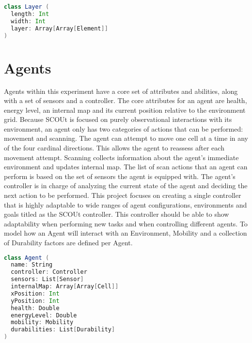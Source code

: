 \begin{lstlisting}[language=Scala]
class Layer (
  length: Int
  width: Int
  layer: Array[Array[Element]]
)
\end{lstlisting}



\section{Agents}
Agents within this experiment have a core set of attributes and abilities, along with a set of sensors and a controller.
The core attributes for an agent are health, energy level, an internal map and its current position relative to the environment grid.
Because SCOUt is focused on purely observational interactions with its environment, an agent only has two categories of actions that can be performed: movement and scanning.
The agent can attempt to move one cell at a time in any of the four cardinal directions.
This allows the agent to reassess after each movement attempt.
Scanning collects information about the agent's immediate environment and updates internal map.
The list of scan actions that an agent can perform is based on the set of sensors the agent is equipped with.
The agent's controller is in charge of analyzing the current state of the agent and deciding the next action to be performed.
This project focuses on creating a single controller that is highly adaptable to wide ranges of agent configurations, environments and goals titled as the SCOUt controller.
This controller should be able to show adaptability when performing new tasks and when controlling different agents.
To model how an Agent will interact with an Environment, Mobility and a collection of Durability factors are defined per Agent.

\begin{lstlisting}[language=Scala]
class Agent (
  name: String
  controller: Controller
  sensors: List[Sensor]
  internalMap: Array[Array[Cell]]
  xPosition: Int
  yPosition: Int
  health: Double
  energyLevel: Double
  mobility: Mobility
  durabilities: List[Durability]
)
\end{lstlisting}


